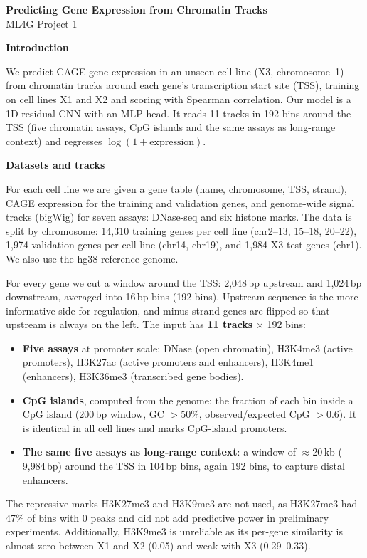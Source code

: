 \documentclass[10pt,a4paper]{article}
\newcommand{\head}[1]{\vspace{2pt}\textbf{\large #1}\par\vspace{-1pt}}
\begin{document}
{\LARGE\bfseries Predicting Gene Expression from Chromatin Tracks}\\[2pt]
{\large ML4G Project 1}

\head{Introduction}
We predict CAGE gene expression in an unseen cell line (X3, chromosome~1) from chromatin tracks around each gene's
transcription start site (TSS), training on cell lines X1 and X2 and scoring with Spearman correlation.
Our model is a 1D residual CNN with an MLP head. It reads 11 tracks in 192 bins around the TSS (five chromatin assays,
CpG islands and the same assays as long-range context) and regresses $\log(1+\text{expression})$.

\head{Datasets and tracks}
For each cell line we are given a gene table (name, chromosome, TSS, strand), CAGE expression for
the training and validation genes, and genome-wide signal tracks (bigWig) for seven assays: DNase-seq
and six histone marks. The data is split by chromosome: 14{,}310 training genes per cell line
(chr2--13, 15--18, 20--22), 1{,}974 validation genes per cell line (chr14, chr19), and 1{,}984 X3 test
genes (chr1). We also use the hg38 reference genome.

For every gene we cut a window around the TSS: 2{,}048\,bp upstream and 1{,}024\,bp downstream,
averaged into 16\,bp bins (192 bins). Upstream sequence is the more informative side for regulation,
and minus-strand genes are flipped so that upstream is always on the left. The input has
\textbf{11 tracks} $\times$ 192 bins:
\begin{itemize}\setlength{\itemsep}{0pt}\setlength{\topsep}{1pt}\setlength{\parskip}{0pt}
\item \textbf{Five assays} at promoter scale: DNase (open chromatin), H3K4me3 (active promoters),
  H3K27ac (active promoters and enhancers), H3K4me1 (enhancers), H3K36me3 (transcribed gene bodies).
\item \textbf{CpG islands}, computed from the genome: the fraction of each bin inside a CpG island
  (200\,bp window, GC $>50\%$, observed/expected CpG $>0.6$). It is identical in all cell lines and
  marks CpG-island promoters.
\item \textbf{The same five assays as long-range context}: a window of $\approx$20\,kb ($\pm$9{,}984\,bp)
  around the TSS in 104\,bp bins, again 192 bins, to capture distal enhancers.
\end{itemize}
The repressive marks H3K27me3 and H3K9me3 are not used, as H3K27me3 had 47\% of bins with 0 peaks and did not add predictive power in preliminary experiments. Additionally, H3K9me3 is unreliable as its per-gene similarity is almost zero between X1 and X2 (0.05) and weak with X3 (0.29--0.33).
\end{document}
